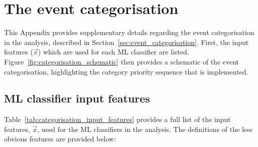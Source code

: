 \chapter{The \Hgg event categorisation}\label{app:event_categorisation}
\vspace{-.3cm}
This Appendix provides supplementary details regarding the event categorisation in the \Hgg analysis, described in Section~\ref{sec:event_categorisation}. First, the input features ($\vec{x}$) which are used for each ML classifier are listed. Figure~\ref{fig:categorisation_schematic} then provides a schematic of the event categorisation, highlighting the category priority sequence that is implemented.

\section{ML classifier input features}
Table~\ref{tab:categorisation_input_features} provides a full list of the input features, $\vec{x}$, used for the ML classifiers in the \Hgg analysis. The definitions of the less obvious features are provided below:

